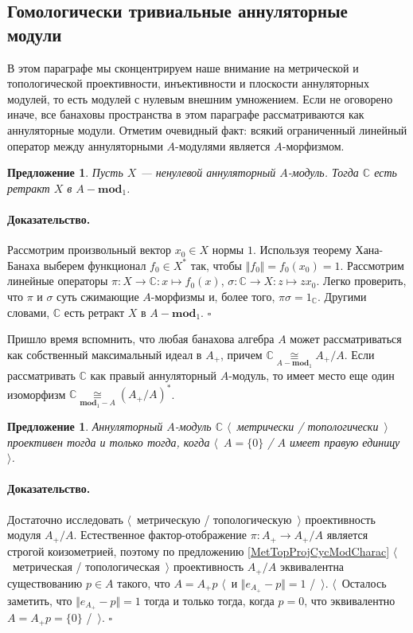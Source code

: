 \documentclass[12pt]{article}
\newcommand{\isom}[1]{\mathop{\mathbin{\cong}}\limits_{#1}}
\newtheorem{proposition}[theorem]{Предложение}
\renewenvironment{proof}{\paragraph{Доказательство.}}{\hfill$\square$\medskip}
\begin{document}
\subsection{Гомологически тривиальные аннуляторные модули}
\label{SubSectionHomoligicallyTrivialAnnihilatorModules}

В этом параграфе мы сконцентрируем наше внимание на метрической и топологической проективности, инъективности и плоскости аннуляторных модулей, то есть модулей с нулевым внешним умножением. Если не оговорено иначе, все банаховы пространства в этом параграфе рассматриваются как аннуляторные модули. Отметим очевидный факт: всякий ограниченный линейный оператор между аннуляторными $A$-модулями является $A$-морфизмом.

\begin{proposition}\label{AnnihCModIsRetAnnihMod} Пусть $X$ --- ненулевой аннуляторный $A$-модуль. Тогда $\mathbb{C}$ есть ретракт $X$ в $A-\mathbf{mod}_1$.
\end{proposition}
\begin{proof} Рассмотрим произвольный вектор $x_0\in X$ нормы $1$. Используя теорему Хана-Банаха выберем функционал $f_0\in X^*$ так, чтобы $\Vert f_0\Vert=f_0(x_0)=1$. Рассмотрим линейные операторы $\pi:X\to \mathbb{C}:x\mapsto f_0(x)$, $\sigma:\mathbb{C}\to X:z\mapsto zx_0$. Легко проверить, что $\pi$ и $\sigma$ суть сжимающие $A$-морфизмы и, более того, $\pi\sigma=1_\mathbb{C}$. Другими словами, $\mathbb{C}$ есть ретракт $X$ в $A-\mathbf{mod}_1$.
\end{proof}

Пришло время вспомнить, что любая банахова алгебра $A$ может рассматриваться как собственный максимальный идеал в $A_+$, причем $\mathbb{C}\isom{A-\mathbf{mod}_1} A_+/A$. Если рассматривать $\mathbb{C}$ как правый аннуляторный $A$-модуль, то имеет место еще один изоморфизм  $\mathbb{C}\isom{\mathbf{mod}_1-A}(A_+/A)^*$. 

\begin{proposition}\label{MetTopProjModCCharac} Аннуляторный $A$-модуль $\mathbb{C}$ $\langle$~метрически / топологически~$\rangle$ проективен тогда и только тогда, когда $\langle$~$A=\{0\}$ / $A$ имеет правую единицу~$\rangle$.
\end{proposition}
\begin{proof} 
Достаточно исследовать $\langle$~метрическую / топологическую~$\rangle$ проективность модуля $A_+/A$. Естественное фактор-отображение $\pi:A_+\to A_+/A$ является строгой коизометрией, поэтому по предложению \ref{MetTopProjCycModCharac} $\langle$~метрическая / топологическая~$\rangle$ проективность $A_+/A$ эквивалентна существованию $p\in A$ такого, что $A=A_+p$ $\langle$~и $\Vert e_{A_+}-p\Vert=1$ /~$\rangle$. $\langle$~Осталось заметить, что $\Vert e_{A_+}-p\Vert=1$ тогда и только тогда, когда $p=0$, что эквивалентно $A=A_+p=\{0\}$ /~$\rangle$.
\end{proof}
\end{document}

